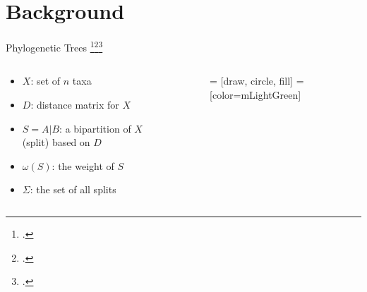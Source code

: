 \documentclass[aspectratio=169]{beamer}
\begin{document}
\section{Background}
\begin{frame}{Phylogenetic Trees \footcite{scornavaccaSplitsUnrootedPhylogenetic2010}\footcite{bryantNeighborNetImprovedAlgorithms2023}\footcite{bagciMicrobialPhylogeneticContext2021}}
    \begin{columns}
        \begin{column}{0.5\textwidth}
            \begin{itemize}
                \item $X$: set of $n$ taxa
                \item $D$: distance matrix for $X$
                \item $S = A | B$: a bipartition of $X$ (split) based on $D$
                \item $\omega(S)$: the weight of $S$
                \item $\Sigma$: the set of all splits
            \end{itemize}
        \end{column}
        \begin{column}{0.5\textwidth}
            \begin{figure}
                 = [draw, circle, fill]  =
                [color=mLightGreen]
            \end{figure}
        \end{column}
    \end{columns} 
\end{frame}
\end{document}
